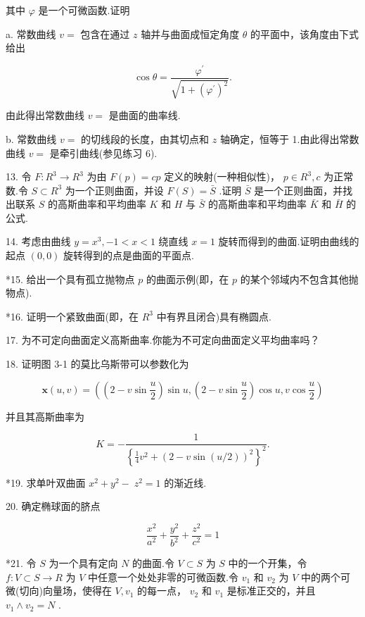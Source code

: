 其中 \(\varphi\) 是一个可微函数.证明

a. 常数曲线 \(v =\) 包含在通过 \(z\) 轴并与曲面成恒定角度 \(\theta\) 的平面中，该角度由下式给出

\[
\cos \theta  = \frac{{\varphi }^{\prime }}{\sqrt{1 + {\left( {\varphi }^{\prime }\right) }^{2}}}.
\]

由此得出常数曲线 \(v =\) 是曲面的曲率线.

b. 常数曲线 \(v =\) 的切线段的长度，由其切点和 \(z\) 轴确定，恒等于 1.由此得出常数曲线 \(v =\) 是牵引曲线(参见练习 6).

13. 令 \(F : {R}^{3} \rightarrow  {R}^{3}\) 为由 \(F\left( p\right)  = {cp}\) 定义的映射(一种相似性)， \(p \in  {R}^{3},c\) 为正常数.令 \(S \subset  {R}^{3}\) 为一个正则曲面，并设 \(F\left( S\right)  = \bar{S}\) .证明 \(\bar{S}\) 是一个正则曲面，并找出联系 \(S\) 的高斯曲率和平均曲率 \(K\) 和 \(H\) 与 \(\bar{S}\) 的高斯曲率和平均曲率 \(\bar{K}\) 和 \(\bar{H}\) 的公式.

14. 考虑由曲线 \(y = {x}^{3}, - 1 < x < 1\) 绕直线 \(x = 1\) 旋转而得到的曲面.证明由曲线的起点 \(\left( {0,0}\right)\) 旋转得到的点是曲面的平面点.

*15. 给出一个具有孤立抛物点 \(p\) 的曲面示例(即，在 \(p\) 的某个邻域内不包含其他抛物点).

*16. 证明一个紧致曲面(即，在 \({R}^{3}\) 中有界且闭合)具有椭圆点.

17. 为不可定向曲面定义高斯曲率.你能为不可定向曲面定义平均曲率吗？

18. 证明图 3-1 的莫比乌斯带可以参数化为

\[
\mathbf{x}\left( {u,v}\right)  = \left( {\left( {2 - v\sin \frac{u}{2}}\right) \sin u,\left( {2 - v\sin \frac{u}{2}}\right) \cos u,v\cos \frac{u}{2}}\right)
\]

并且其高斯曲率为

\[
K =  - \frac{1}{{\left\{  \frac{1}{4}{v}^{2} + {\left( 2 - v\sin \left( u/2\right) \right) }^{2}\right\}  }^{2}}.
\]

*19. 求单叶双曲面 \({x}^{2} + {y}^{2} - \; {z}^{2} = 1\) 的渐近线.

20. 确定椭球面的脐点

\[
\frac{{x}^{2}}{{a}^{2}} + \frac{{y}^{2}}{{b}^{2}} + \frac{{z}^{2}}{{c}^{2}} = 1
\]

*21. 令 \(S\) 为一个具有定向 \(N\) 的曲面.令 \(V \subset  S\) 为 \(S\) 中的一个开集，令 \(f : V \subset  S \rightarrow  R\) 为 \(V\) 中任意一个处处非零的可微函数.令 \({v}_{1}\) 和 \({v}_{2}\) 为 \(V\) 中的两个可微(切向)向量场，使得在 \(V,{v}_{1}\) 的每一点， \({v}_{2}\) 和 \({v}_{1}\) 是标准正交的，并且 \({v}_{1} \land  {v}_{2} = N\) .

